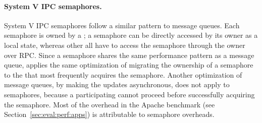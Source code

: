 
\paragraph{System V IPC semaphores.} System V IPC semaphores 
follow a similar pattern to message queues.
Each semaphore is owned by a \picoproc{};
a semaphore can be directly accessed by its owner as a local state,
whereas other \picoprocs{} all have to access the semaphore through the owner over RPC.
Since a semaphore shares the same performance pattern as a message queue,
\thelibos{} applies the same optimization
of migrating the ownership of a semaphore
to the \picoproc{} that most frequently acquires the semaphore.
Another optimization of message queues, by making the updates asynchronous,
does not apply to semaphores,
because a participating \picoproc{} cannot proceed before successfully acquiring the semaphore. 
Most of the overhead in the Apache benchmark (see Section~\ref{sec:eval:perf:apps}) is attributable to semaphore overheads.

